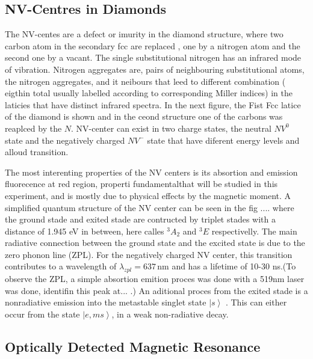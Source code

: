 \subsection{NV-Centres in Diamonds}
 The NV-centes are a defect or imurity in the diamond structure, where two carbon atom in the secondary fcc are replaced , one by a nitrogen atom and the second one by a  vacant. The single substitutional nitrogen has an infrared mode of vibration. Nitrogen aggregates are, pairs of neighbouring substitutional atoms, the nitrogen aggregates, and it neibours that leed to different combination ( eigthin total usually labelled according to corresponding Miller indices) in the laticies that have distinct infrared spectra. In the next figure, the Fist Fcc latice of the diamond is shown and in the ceond structure one of the carbons was reaplced by the $N$. NV-center can exist in two charge states, the neutral $NV^{0}$ state and the negatively charged $NV^{-}$ state that have diferent energy levels and alloud transition.
 
The most interenting properties of the NV centers is its absortion and emission fluorecence at red region, properti fundamentalthat will be studied in this experiment, and is mostly due to physical effects by the magnetic moment. A simplified quantum structure of the NV center can be seen in the fig .... where the ground stade and exited stade are contructed by triplet stades with a distance of 1.945 eV in between, here calles $^{3}A_{2}$ and $^{3}E$  respectivelly. The main radiative connection between the ground state and the excited state is due to the zero phonon line (ZPL). For the negatively charged NV center, this transition contributes to a wavelength of $\lambda_{zpl} = 637\,\mathrm{nm}$ and has a lifetime of 10-30 ns.(To observe the ZPL, a simple absortion emition proces was done with a 519nm laser was done, identifin this peak at... .) 
An aditional proces from the exited stade is a nonradiative emission into the metastable singlet state $\left|s\right\rangle$ . This can either occur from the state $\left| e,ms\right\rangle$, in a weak non-radiative decay.


\subsection{Optically Detected Magnetic Resonance}







